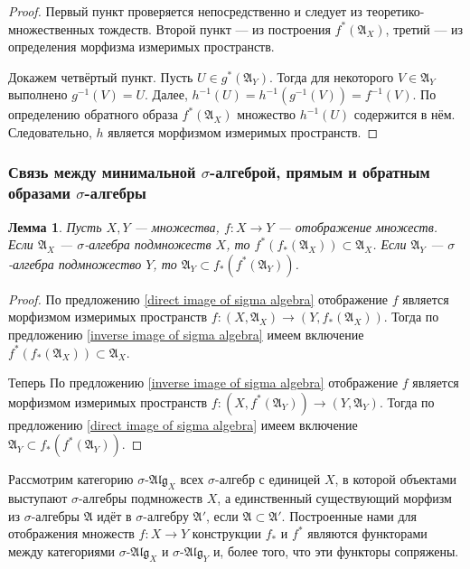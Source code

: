 \documentclass[12pt]{article}
\newtheorem{lemma}[theorem]{Лемма}
\numberwithin{theorem}{section}
\theoremstyle{definition}
\newcommand{\setsigmaalg}{\mathfrak{A}}
\begin{document}
	\begin{proof}
		Первый пункт проверяется непосредственно и следует из теоретико-множественных тождеств.
		Второй пункт --- из построения $ f^{*}(\setsigmaalg_X) $, третий --- из определения морфизма измеримых пространств.
		
		Докажем четвёртый пункт. Пусть $ U \in g^*(\setsigmaalg_Y) $. Тогда для некоторого $ V \in \setsigmaalg_Y $ выполнено $ g^{-1}(V) = U $. Далее, $ h^{-1}(U) = h^{-1}(g^{-1}(V)) = f^{-1}(V) $.
		По определению обратного образа $ f^*(\setsigmaalg_X) $ множество $ h^{-1}(U) $ содержится в нём.
		Следовательно, $ h $ является морфизмом измеримых пространств.
	\end{proof}
	
	\subsubsection{Связь между минимальной $ \sigma $-алгеброй, прямым и обратным образами $ \sigma $-алгебры}
	
	\begin{lemma} \label{inclusions direct-inverse}
		Пусть $ X, Y $ --- множества, $ f \colon X \to Y $ --- отображение множеств.
		Если $ \setsigmaalg_X $ --- $ \sigma $-алгебра подмножеств $ X $, то $ f^*(f_*(\setsigmaalg_X)) \subset  \setsigmaalg_X $.
		Если $ \setsigmaalg_Y $ --- $ \sigma $-алгебра подмножество $ Y $, то $ \setsigmaalg_Y \subset f_*(f^*(\setsigmaalg_Y)) $.
	\end{lemma}
	
	\begin{proof}
		По предложению \ref{direct image of sigma algebra} отображение $ f $ является
		морфизмом измеримых пространств $ f \colon (X, \setsigmaalg_X) \to (Y, f_*(\setsigmaalg_X)) $.
		Тогда по предложению \ref{inverse image of sigma algebra} имеем включение
		$ f^*(f_*(\setsigmaalg_X)) \subset  \setsigmaalg_X $.
		
		Теперь По предложению \ref{inverse image of sigma algebra} отображение $ f $ является
		морфизмом измеримых пространств $ f \colon (X, f^*(\setsigmaalg_Y)) \to (Y, \setsigmaalg_Y) $.
		Тогда по предложению \ref{direct image of sigma algebra} имеем включение
		$ \setsigmaalg_Y \subset f_*(f^*(\setsigmaalg_Y)) $.
	\end{proof}
	
	Рассмотрим категорию $ \sigma $-$ \mathfrak{Alg}_X $ всех $ \sigma $-алгебр с единицей $ X $,
	в которой объектами выступают $ \sigma $-алгебры подмножеств $ X $,
	а единственный существующий морфизм из $ \sigma $-алгебры $ \setsigmaalg $ идёт в $ \sigma $-алгебру $ \setsigmaalg' $,
	если $ \setsigmaalg \subset \setsigmaalg' $. Построенные нами для отображения множеств $ f \colon X \to Y $
	конструкции $ f_* $ и $ f^* $ являются функторами между категориями $ \sigma $-$ \mathfrak{Alg}_X $
	и $ \sigma $-$ \mathfrak{Alg}_Y $ и, более того, что эти функторы сопряжены.
	
\end{document}
